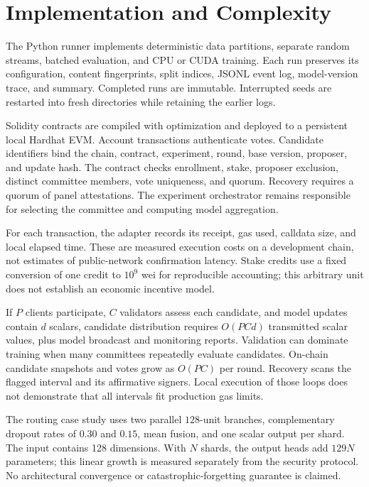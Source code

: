 \section{Implementation and Complexity}
\label{sec:implementation}
The Python runner implements deterministic data partitions, separate random
streams, batched evaluation, and CPU or CUDA training. Each run preserves its
configuration, content fingerprints, split indices, JSONL event log, model-version
trace, and summary. Completed runs are immutable. Interrupted seeds are restarted
into fresh directories while retaining the earlier logs.

Solidity contracts are compiled with optimization and deployed to a persistent
local Hardhat EVM. Account transactions authenticate votes. Candidate identifiers
bind the chain, contract, experiment, round, base version, proposer, and update
hash. The contract checks enrollment, stake, proposer exclusion, distinct
committee members, vote uniqueness, and quorum. Recovery requires a quorum of
panel attestations. The experiment orchestrator remains responsible for selecting
the committee and computing model aggregation.

For each transaction, the adapter records its receipt, gas used, calldata size,
and local elapsed time. These are measured execution costs on a development chain,
not estimates of public-network confirmation latency. Stake credits use a fixed
conversion of one credit to $10^9$ wei for reproducible accounting; this arbitrary
unit does not establish an economic incentive model.

If $P$ clients participate, $C$ validators assess each candidate, and model updates
contain $d$ scalars, candidate distribution requires $O(PCd)$ transmitted scalar
values, plus model broadcast and monitoring reports. Validation can dominate
training when many committees repeatedly evaluate candidates. On-chain candidate
snapshots and votes grow as $O(PC)$ per round. Recovery scans the flagged interval
and its affirmative signers. Local execution of those loops does not demonstrate
that all intervals fit production gas limits.


The routing case study uses two parallel $128$-unit branches, complementary
dropout rates of $0.30$ and $0.15$, mean fusion, and one scalar output per shard.
The input contains 128 dimensions. With $N$ shards, the output heads add $129N$
parameters; this linear growth is measured separately from the security protocol.
No architectural convergence or catastrophic-forgetting guarantee is claimed.

